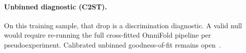 \paragraph{Unbinned diagnostic (C2ST).} On this training sample, that drop is a discrimination diagnostic. A valid null would require re-running the full cross-fitted OmniFold pipeline per pseudoexperiment. Calibrated unbinned goodness-of-fit remains open~\cite{Canelli:2025guide}.
